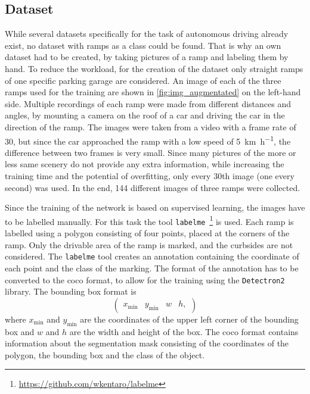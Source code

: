 \subsection{Dataset}
While several datasets specifically for the task of autonomous driving already exist, no dataset with ramps as a class could be found.
That is why an own dataset had to be created, by taking pictures of a ramp and labeling them by hand.
To reduce the workload, for the creation of the dataset only straight ramps of one specific parking garage are considered.
An image of each of the three ramps used for the training are shown in \cref{fig:img_augmentated} on the left-hand side.
Multiple recordings of each ramp were made from different distances and angles, by mounting a camera on the roof of a car and driving the car in the direction of the ramp.
The images were taken from a video with a frame rate of 30, but since the car approached the ramp with a low speed of \SI{5}{\kilo\metre\per\hour}, the difference between two frames is very small.
Since many pictures of the more or less same scenery do not provide any extra information, while increasing the training time and the potential of overfitting, only every 30th image (one every second) was used.
In the end, 144 different images of three ramps were collected.\par
Since the training of the network is based on supervised learning, the images have to be labelled manually.
For this task the tool \texttt{labelme}~\footnote{\url{https://github.com/wkentaro/labelme}} \cite{Wada2018} is used.
Each ramp is labelled using a polygon consisting of four points, placed at the corners of the ramp.
Only the drivable area of the ramp is marked, and the curbsides are not considered.
The \texttt{labelme} tool creates an annotation containing the coordinate of each point and the class of the marking.
The format of the annotation has to be converted to the \gls{coco} format, to allow for the training using the \texttt{Detectron2} library.
The bounding box format is
\[
	\begin{pmatrix}
		x_\mathrm{min} & y_\mathrm{min} & w & h,
	\end{pmatrix}
\]
where $x_\mathrm{min}$ and $y_\mathrm{min}$ are the coordinates of the upper left corner of the bounding box and $w$ and $h$ are the width and height of the box.
The \gls{coco} format contains information about the segmentation mask consisting of the coordinates of the polygon, the bounding box and the class of the object.
